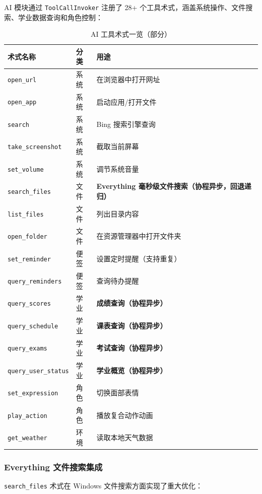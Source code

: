 \documentclass[12pt,a4paper]{ctexart}
\begin{document}
AI 模块通过 \texttt{ToolCallInvoker} 注册了 28+ 个工具术式，涵盖系统操作、文件搜索、学业数据查询和角色控制：

\begin{table}[H]
\centering
\caption{AI 工具术式一览（部分）}
\label{tab:ai-data-tools}
\begin{tabular}{lll}
\toprule
\textbf{术式名称} & \textbf{分类} & \textbf{用途} \\
\midrule
\texttt{open\_url} & 系统 & 在浏览器中打开网址 \\
\texttt{open\_app} & 系统 & 启动应用/打开文件 \\
\texttt{search} & 系统 & Bing 搜索引擎查询 \\
\texttt{take\_screenshot} & 系统 & 截取当前屏幕 \\
\texttt{set\_volume} & 系统 & 调节系统音量 \\
\texttt{search\_files} & 文件 & \textbf{Everything 毫秒级文件搜索（协程异步，回退递归）} \\
\texttt{list\_files} & 文件 & 列出目录内容 \\
\texttt{open\_folder} & 文件 & 在资源管理器中打开文件夹 \\
\texttt{set\_reminder} & 便签 & 设置定时提醒（支持重复） \\
\texttt{query\_reminders} & 便签 & 查询待办提醒 \\
\texttt{query\_scores} & 学业 & \textbf{成绩查询（协程异步）} \\
\texttt{query\_schedule} & 学业 & \textbf{课表查询（协程异步）} \\
\texttt{query\_exams} & 学业 & \textbf{考试查询（协程异步）} \\
\texttt{query\_user\_status} & 学业 & \textbf{学业概览（协程异步）} \\
\texttt{set\_expression} & 角色 & 切换面部表情 \\
\texttt{play\_action} & 角色 & 播放复合动作动画 \\
\texttt{get\_weather} & 环境 & 读取本地天气数据 \\
\bottomrule
\end{tabular}
\end{table}

\subsubsection{Everything 文件搜索集成}

\texttt{search\_files} 术式在 Windows 文件搜索方面实现了重大优化：
\end{document}
